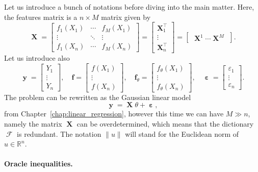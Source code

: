 \documentclass[
	fontsize=11pt, %
	twoside=false, %
	numbers=noenddot, %
]{kaobook}
\DeclareMathOperator{\cF}{{\mathcal F}}
\DeclareMathOperator{\bX}{{\boldsymbol X}}
\renewcommand{\bf}{{\boldsymbol f}}
\DeclareMathOperator{\by}{{\boldsymbol y}}
\DeclareMathOperator{\beps}{\boldsymbol \varepsilon}
\newcommand{\eps}{\varepsilon}
\newcommand{\R}{\mathbb R}
\newcommand{\norm}[1]{\| #1 \|}
\begin{document}
Let us introduce a bunch of notations before diving into the main matter.
Here, the features matrix is a $n \times M$ matrix given by
\begin{equation*}
	\bX = 
	\begin{bmatrix}
		f_1(X_1) & \cdots & f_M(X_1) \\
		\vdots & \ddots & \vdots \\
		f_1(X_n) & \cdots & f_M(X_n)
	\end{bmatrix}	
	=
	\begin{bmatrix}
		\bX_1^\top \\
		\vdots \\
		\bX_n^\top 
	\end{bmatrix}
	= 
	\begin{bmatrix}
		\bX^1 \cdots \bX^M
	\end{bmatrix}.
\end{equation*}
Let us introduce also
\begin{equation*}
	\by =
	\begin{bmatrix}
		Y_1 \\
		\vdots \\
		Y_n
	\end{bmatrix},
	\quad
	\bf = 
	\begin{bmatrix}
		f(X_1) \\
		\vdots \\
		f(X_n)
	\end{bmatrix},
	\quad
	\bf_\theta =	
	\begin{bmatrix}
		f_\theta(X_1) \\
		\vdots \\
		f_\theta(X_n)
	\end{bmatrix},
	\quad
	\beps = 
	\begin{bmatrix}
		\eps_1 \\
		\vdots \\
		\eps_n
	\end{bmatrix}.
\end{equation*}
The problem can be rewritten as the Gaussian linear model
\begin{equation*}
	\by = \bX \theta + \beps,
\end{equation*}
from Chapter~\ref{chap:linear_regression}, however this time we can have $M \gg n$, namely the matrix $\bX$ can be overdetermined, which means that the dictionary $\cF$ is redundant.
The notation $\norm{u}$ will stand for the Euclidean norm of $u \in \R^n$.

\paragraph{Oracle inequalities.}
\end{document}
